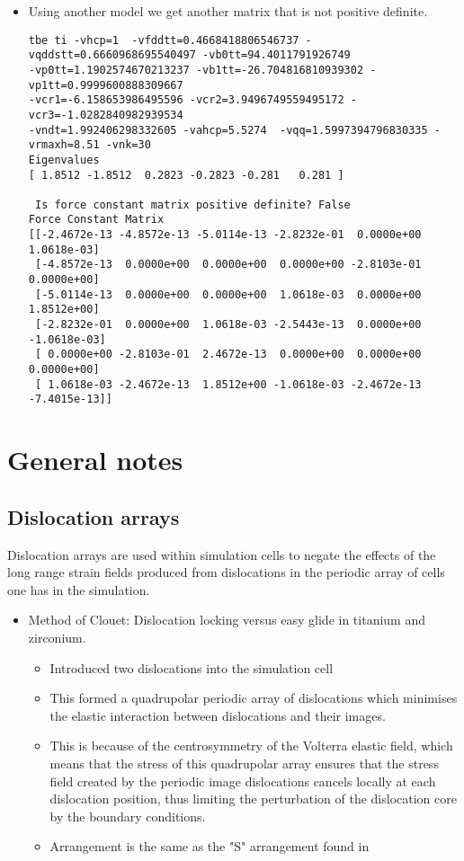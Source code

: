 \documentclass[11pt]{article}
\begin{document}
\begin{itemize}
\item Using another model we get another matrix that is not positive
definite. 
\begin{verbatim}
tbe ti -vhcp=1  -vfddtt=0.4668418806546737 -vqddstt=0.6660968695540497 -vb0tt=94.4011791926749 
-vp0tt=1.1902574670213237 -vb1tt=-26.704816810939302 -vp1tt=0.9999600888309667 
-vcr1=-6.158653986495596 -vcr2=3.9496749559495172 -vcr3=-1.0282840982939534 
-vndt=1.992406298332605 -vahcp=5.5274  -vqq=1.5997394796830335 -vrmaxh=8.51 -vnk=30 
Eigenvalues
[ 1.8512 -1.8512  0.2823 -0.2823 -0.281   0.281 ]

 Is force constant matrix positive definite? False
Force Constant Matrix
[[-2.4672e-13 -4.8572e-13 -5.0114e-13 -2.8232e-01  0.0000e+00  1.0618e-03]
 [-4.8572e-13  0.0000e+00  0.0000e+00  0.0000e+00 -2.8103e-01  0.0000e+00]
 [-5.0114e-13  0.0000e+00  0.0000e+00  1.0618e-03  0.0000e+00  1.8512e+00]
 [-2.8232e-01  0.0000e+00  1.0618e-03 -2.5443e-13  0.0000e+00 -1.0618e-03]
 [ 0.0000e+00 -2.8103e-01  2.4672e-13  0.0000e+00  0.0000e+00  0.0000e+00]
 [ 1.0618e-03 -2.4672e-13  1.8512e+00 -1.0618e-03 -2.4672e-13 -7.4015e-13]]
\end{verbatim}
\end{itemize}




\section{General notes}
\label{sec-2}
\subsection{Dislocation arrays}
\label{sec-2-1}
Dislocation arrays are used within simulation cells to negate the effects of
the long range strain fields produced from dislocations in the periodic array
of cells one has in the simulation.
\begin{itemize}
\item Method of Clouet: Dislocation locking versus easy glide in titanium and
zirconium. \cite{Clouet2015}
\begin{itemize}
\item Introduced two dislocations into the simulation cell
\item This formed a quadrupolar periodic array of dislocations which
minimises the elastic interaction between dislocations and their
images.
\item This is because of the centrosymmetry of the Volterra elastic field,
which means that the stress of this quadrupolar array ensures that the
stress field created by the periodic image dislocations cancels locally
at each dislocation position, thus limiting the perturbation of the
dislocation core by the boundary conditions.
\item Arrangement is the same as the "S" arrangement found in
\cite{Clouet2012}
\end{itemize}
\end{itemize}
\end{document}
